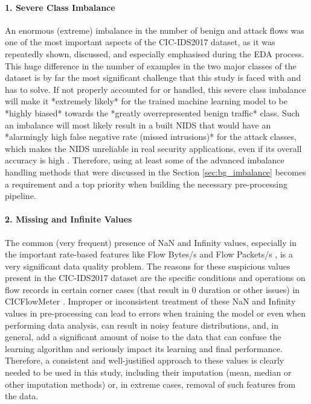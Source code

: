 \paragraph{1. Severe Class Imbalance} 
An enormous (extreme) imbalance in the number of benign and attack flows was one of the most important aspects of the CIC-IDS2017 dataset, as it was repeatedly shown, discussed, and especially emphasised during the EDA process. This huge difference in the number of examples in the two major classes of the dataset is by far the most significant challenge that this study is faced with and has to solve. If not properly accounted for or handled, this severe class imbalance will make it *extremely likely* for the trained machine learning model to be *highly biased* towards the *greatly overrepresented benign traffic* class. Such an imbalance will most likely result in a built NIDS that would have an *alarmingly high false negative rate (missed intrusions)* for the attack classes, which makes the NIDS unreliable in real security applications, even if its overall accuracy is high \parencite{mahfouz2022systematic}. Therefore, using at least some of the advanced imbalance handling methods that were discussed in the Section \ref{sec:bg_imbalance} becomes a requirement and a top priority when building the necessary pre-processing pipeline.

\paragraph{2. Missing and Infinite Values} 
The common (very frequent) presence of NaN and Infinity values, especially in the important rate-based features like Flow Bytes/s and Flow Packets/s , is a very significant data quality problem. The reasons for these suspicious values present in the CIC-IDS2017 dataset are the specific conditions and operations on flow records in certain corner cases (that result in 0 duration or other issues) in CICFlowMeter \parencite{sharafaldin2018toward}. Improper or inconsistent treatment of these NaN and Infinity values in pre-processing can lead to errors when training the model or even when performing data analysis, can result in noisy feature distributions, and, in general, add a significant amount of noise to the data that can confuse the learning algorithm and seriously impact its learning and final performance. Therefore, a consistent and well-justified approach to these values is clearly needed to be used in this study, including their imputation (mean, median or other imputation methods) or, in extreme cases, removal of such features from the data.

